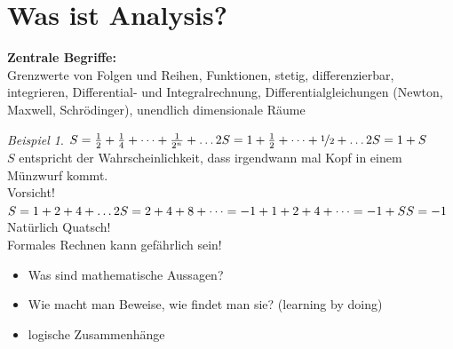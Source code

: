 \documentclass[12pt,a4paper,titlepage]{article} %
\theoremstyle{definition}
\theoremstyle{remark}
\newtheorem*{bsp}{Beispiel}
\begin{document}
\section{Was ist Analysis?}
\textbf{Zentrale Begriffe:}\\
Grenzwerte von Folgen und Reihen, Funktionen, stetig, differenzierbar, integrieren, Differential- und Integralrechnung, Differentialgleichungen (Newton, Maxwell, Schrödinger), unendlich dimensionale Räume
\begin{bsp}
	$S = \frac{1}{2} + \frac{1}{4} + \dots + \frac{1}{2^n} + \dots\\
	2S = 1 + \frac{1}{2} + \dots + \nicefrac{1}{2} + \dots\\
	2S = 1 + S$\\
	$S$ entspricht der Wahrscheinlichkeit, dass irgendwann mal Kopf in einem Münzwurf kommt.\\
	Vorsicht!\\
	$S = 1 + 2 + 4 + \dots\\
	2S = 2 + 4 + 8 + \dots = -1 + 1 + 2 + 4 + \dots = -1 + S\\
	S = -1$\\
	Natürlich Quatsch!\\
  	Formales Rechnen kann gefährlich sein!

	\begin{itemize}
		\item Was sind mathematische Aussagen?
		\item Wie macht man Beweise, wie findet man sie? (learning by doing)
		\item logische Zusammenhänge
	\end{itemize}
\end{bsp}
\end{document}
